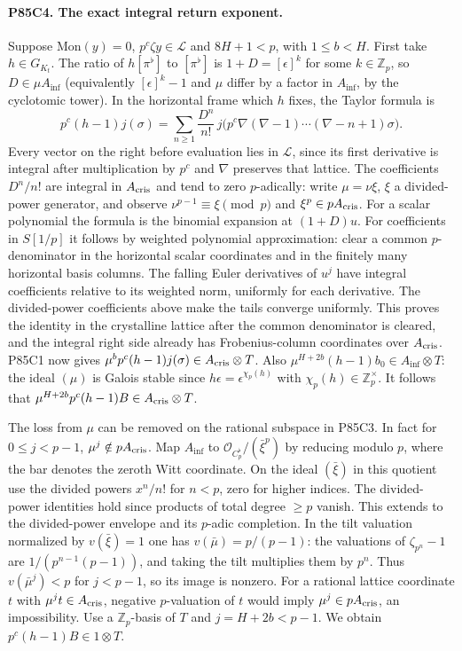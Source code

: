 \paragraph{P85C4. The exact integral return exponent.}
Suppose $\mathrm{Mon}(y)=0$, $p^c\zeta y\in\mathcal L$ and
$8H+1<p$, with $1\le b<H$. First take $h\in G_{K_t}$.
The ratio of $h[\pi^\flat]$ to $[\pi^\flat]$ is
$1+D=[\epsilon]^k$ for some $k\in\mathbb Z_p$, so $D\in
\mu A_{\inf}$ (equivalently $[\epsilon]^k-1$ and $\mu$ differ
by a factor in $A_{\inf}$, by the cyclotomic tower).
In the horizontal frame which $h$ fixes, the Taylor formula is
\[
 p^c(h-1)j(\sigma)=\sum_{n\ge1}
       \frac{D^n}{n!}\,j\big(p^c\nabla(\nabla-1)\cdots
                       (\nabla-n+1)\sigma\big).
\]
Every vector on the right before evaluation lies in $\mathcal L$,
since its first derivative is integral after multiplication by $p^c$
and $\nabla$ preserves that lattice. The coefficients $D^n/n!$
are integral in $A_{\rm cris}$ and tend to zero $p$-adically:
write $\mu=\nu\xi$, $\xi$ a divided-power generator, and observe
$\nu^{p-1}\equiv\xi\pmod p$ and $\xi^p\in pA_{\rm cris}$.
For a scalar polynomial the formula is the binomial expansion
at $(1+D)u$. For coefficients in $S[1/p]$ it follows by weighted
polynomial approximation: clear a common $p$-denominator in
the horizontal scalar coordinates and in the finitely many
horizontal basis columns. The falling Euler derivatives of
$u^j$ have integral coefficients relative to its weighted norm,
uniformly for each derivative. The divided-power coefficients
above make the tails converge uniformly. This proves the identity
in the crystalline lattice after the common denominator is cleared,
and the integral right side already has Frobenius-column
coordinates over $A_{\rm cris}$. P85C1 now gives
$\mu^b p^c(h-1)j(\sigma)\in A_{\rm cris}\otimes T$.
Also $\mu^{H+2b}(h-1)b_0\in A_{\inf}\otimes T$:
the ideal $(\mu)$ is Galois stable since $h\epsilon=\epsilon^{\chi_p(h)}$
with $\chi_p(h)\in\mathbb Z_p^\times$. It follows that
$\mu^{H+2b}p^c(h-1)B\in A_{\rm cris}\otimes T$.

The loss from $\mu$ can be removed on the rational subspace in P85C3.
In fact for $0\le j<p-1$, $\mu^j\notin p A_{\rm cris}$.
Map $A_{\inf}$ to $\mathcal O_{C_p^\flat}/(\bar\xi^p)$ by reducing
modulo $p$, where the bar denotes the zeroth Witt coordinate.
On the ideal $(\bar\xi)$ in this quotient use the divided powers
$x^n/n!$ for $n<p$, zero for higher indices. The divided-power
identities hold since products of total degree $\ge p$ vanish.
This extends to the divided-power envelope and its $p$-adic
completion. In the tilt valuation normalized by
$v(\bar\xi)=1$ one has $v(\bar\mu)=p/(p-1)$: the valuations
of $\zeta_{p^n}-1$ are $1/(p^{n-1}(p-1))$, and taking the tilt
multiplies them by $p^n$. Thus $v(\bar\mu^j)<p$ for $j<p-1$,
so its image is nonzero. For a rational lattice coordinate $t$
with $\mu^j t\in A_{\rm cris}$, negative $p$-valuation of $t$
would imply $\mu^j\in pA_{\rm cris}$, an impossibility.
Use a $\mathbb Z_p$-basis of $T$ and $j=H+2b<p-1$.
We obtain $p^c(h-1)B\in1\otimes T$.

